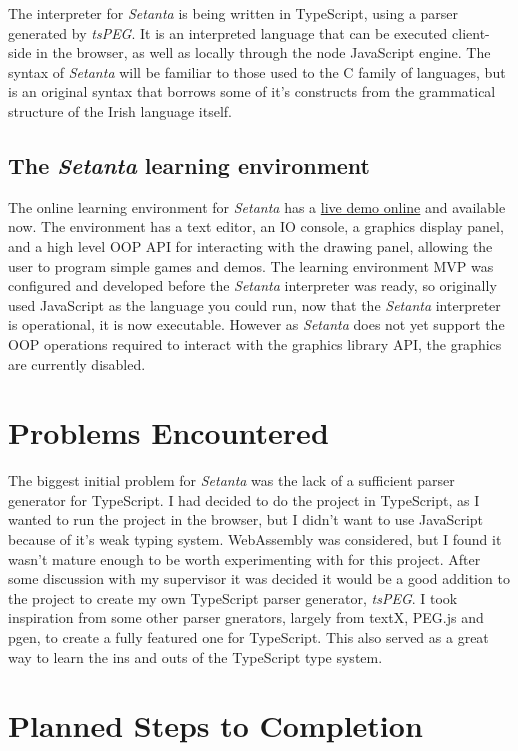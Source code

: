 \documentclass[11pt]{extarticle}
\newcommand{\Setanta}{\emph{Setanta}}
\newcommand{\tsPEG}{\emph{tsPEG}}
\begin{document}
            The interpreter for \Setanta{} is being written in TypeScript, using a parser generated by \tsPEG{}.
            It is an interpreted language that can be executed client-side in the browser, as well as locally through the node JavaScript engine.
            The syntax of \Setanta{} will be familiar to those used to the C family of languages, but is an original syntax that borrows some of it's constructs from the grammatical structure of the Irish language itself.

        \subsection{The \Setanta{} learning environment}

        The online learning environment for \Setanta{} has a \href{https://vey.ie/goto?go=fyp}{live demo online} and available now. The environment has a text editor, an IO console, a graphics display panel, and a high level OOP API for interacting with the drawing panel, allowing the user to program simple games and demos.
        The learning environment MVP was configured and developed before the \Setanta{} interpreter was ready, so originally used JavaScript as the language you could run, now that the \Setanta{} interpreter is operational, it is now executable. However as \Setanta{} does not yet support the OOP operations required to interact with the graphics library API, the graphics are currently disabled.

    \section{Problems Encountered}

    The biggest initial problem for \Setanta{} was the lack of a sufficient parser generator for TypeScript. I had decided to do the project in TypeScript, as I wanted to run the project in the browser, but I didn't want to use JavaScript because of it's weak typing system. WebAssembly was considered, but I found it wasn't mature enough to be worth experimenting with for this project.
    After some discussion with my supervisor it was decided it would be a good addition to the project to create my own TypeScript parser generator, \tsPEG{}. I took inspiration from some other parser gnerators, largely from textX, PEG.js and pgen, to create a fully featured one for TypeScript. This also served as a great way to learn the ins and outs of the TypeScript type system.

    \section{Planned Steps to Completion}
\end{document}
